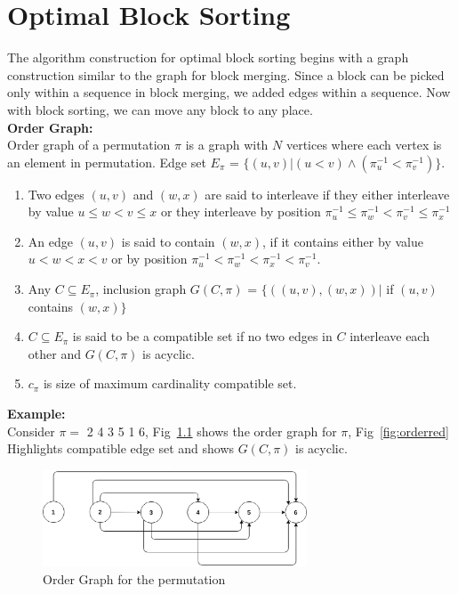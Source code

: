 \documentclass[BTech]{iitmdiss}
\begin{document}
\chapter{Optimal Block Sorting}
The algorithm construction for optimal block sorting begins with a graph construction similar to the graph for block merging. Since a block can be picked only within a sequence in block merging, we added edges within a sequence. Now with block sorting, we can move any block to any place. \\
\textbf{Order Graph:}\\
Order graph of a permutation $\pi$ is a graph with $N$ vertices where each vertex is an element in permutation. Edge set $E_{\pi}$ = $\{ (u,v) | (u<v) \land (\pi_{u}^{-1} < \pi_{v}^{-1})\}$.\\
\begin{enumerate}
    \item Two edges $(u,v)$ and $(w,x)$ are said to interleave if they either interleave by value $u\leq w<v\leq x$  or they interleave by position $\pi_{u}^{-1}\leq \pi_{w}^{-1}<\pi_{v}^{-1}\leq \pi_{x}^{-1}$
    \item An edge $(u,v)$ is said to contain $(w,x)$, if it contains either by value $u<w<x<v$ or by position $\pi_{u}^{-1} < \pi_{w}^{-1} < \pi_{x}^{-1}< \pi_{v}^{-1}$. 
    \item Any $C\subseteq E_{\pi}$, inclusion graph $G(C,\pi)$ = $\{ ((u,v),(w,x)) |$ if $(u,v)$ contains $(w,x)\}$
    \item $C\subseteq E_{\pi}$ is said to be a compatible set if no two edges in $C$ interleave each other and $G(C,\pi)$ is acyclic.
    \item $c_{\pi}$ is size of maximum cardinality compatible set. 
\end{enumerate}
\noindent
\textbf{Example:}\\
Consider $\pi = $ 2 4 3 5 1 6, Fig~\ref{fig:ordergraph} shows the order graph for $\pi$, Fig~\ref{fig:orderred} Highlights compatible edge set and shows $G(C,\pi)$ is acyclic. 
\begin{figure}[htpb]
  \begin{center}
    \includegraphics[width=0.7\textwidth]{blocksorting.eps}
    \caption {Order Graph for the permutation}
  	\label{fig:ordergraph}
  \end{center}
\end{figure}
\end{document}
